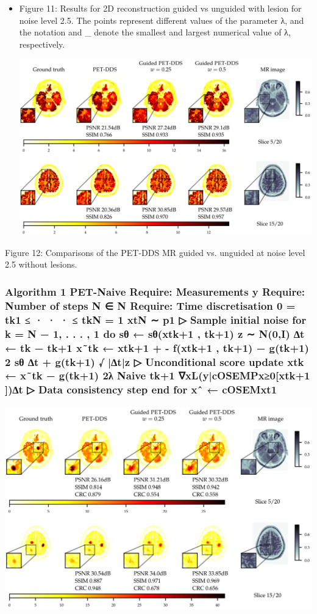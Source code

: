 \documentclass{article}
\begin{document}
\begin{itemize}
\item 
Figure 11: Results for 2D reconstruction guided vs unguided with lesion for noise level 2.5. The points represent different values of the parameter λ, and the notation and \_ denote the smallest and largest numerical value of λ, respectively.

\includegraphics{_page_34_Figure_1.png}


\end{itemize}

Figure 12: Comparisons of the PET-DDS MR guided vs. unguided at noise level 2.5 without lesions.

\subsubsection{Algorithm 1 PET-Naive Require: Measurements y Require: Number of steps N ∈ N Require: Time discretisation 0 = tk1 ≤ · · · ≤ tkN = 1 xtN ∼ p1 ▷ Sample initial noise for k = N − 1, . . . , 1 do sθ ← sθ(xtk+1 , tk+1) z ∼ N(0,I) ∆t ← tk − tk+1 x˜tk ← xtk+1 + - f(xtk+1 , tk+1) − g(tk+1) 2 sθ ∆t + g(tk+1) √ |∆t|z ▷ Unconditional score update xtk ← x˜tk − g(tk+1) 2λ Naive tk+1 ∇xL(y|cOSEMPx≥0[xtk+1 ])∆t ▷ Data consistency step end for xˆ ← cOSEMxt1}


\includegraphics{_page_35_Figure_1.png}
\end{document}
